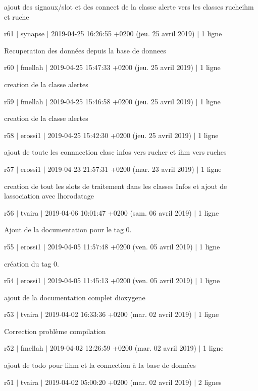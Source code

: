 ajout des signaux/slot et des connect de la classe alerte vers les classes rucheihm et ruche

r61 $\vert$ synapse $\vert$ 2019-\/04-\/25 16\+:26\+:55 +0200 (jeu. 25 avril 2019) $\vert$ 1 ligne

Recuperation des données depuis la base de donnees

r60 $\vert$ fmellah $\vert$ 2019-\/04-\/25 15\+:47\+:33 +0200 (jeu. 25 avril 2019) $\vert$ 1 ligne

creation de la classe alertes

r59 $\vert$ fmellah $\vert$ 2019-\/04-\/25 15\+:46\+:58 +0200 (jeu. 25 avril 2019) $\vert$ 1 ligne

creation de la classe alertes

r58 $\vert$ erossi1 $\vert$ 2019-\/04-\/25 15\+:42\+:30 +0200 (jeu. 25 avril 2019) $\vert$ 1 ligne

ajout de toute les connnection clase infos vers rucher et ihm vers ruches

r57 $\vert$ erossi1 $\vert$ 2019-\/04-\/23 21\+:57\+:31 +0200 (mar. 23 avril 2019) $\vert$ 1 ligne

creation de tout les slots de traitement dans les classes Infos et ajout de l\textquotesingle{}association avec l\textquotesingle{}horodatage

r56 $\vert$ tvaira $\vert$ 2019-\/04-\/06 10\+:01\+:47 +0200 (sam. 06 avril 2019) $\vert$ 1 ligne

Ajout de la documentation pour le tag 0.

r55 $\vert$ erossi1 $\vert$ 2019-\/04-\/05 11\+:57\+:48 +0200 (ven. 05 avril 2019) $\vert$ 1 ligne

création du tag 0.

r54 $\vert$ erossi1 $\vert$ 2019-\/04-\/05 11\+:45\+:13 +0200 (ven. 05 avril 2019) $\vert$ 1 ligne

ajout de la documentation complet dioxygene

r53 $\vert$ tvaira $\vert$ 2019-\/04-\/02 16\+:33\+:36 +0200 (mar. 02 avril 2019) $\vert$ 1 ligne

Correction problème compilation

r52 $\vert$ fmellah $\vert$ 2019-\/04-\/02 12\+:26\+:59 +0200 (mar. 02 avril 2019) $\vert$ 1 ligne

ajout de todo pour l\textquotesingle{}ihm et la connection à la base de données

r51 $\vert$ tvaira $\vert$ 2019-\/04-\/02 05\+:00\+:20 +0200 (mar. 02 avril 2019) $\vert$ 2 lignes

